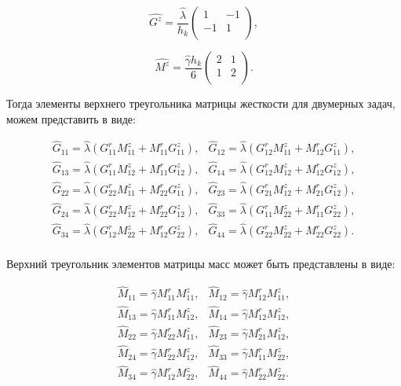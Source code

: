 \begin{equation*}
	\hat{G^z} = \frac{\hat{\lambda}}{h_k} \left(
	\begin{array}{rr}
		1 & -1\\
		-1 &  1\\
	\end{array}
	\right),
\end{equation*}

\begin{equation*}
	\hat{M^z} = \frac{\hat{\gamma} h_k}{6} \left(
	\begin{array}{rr}
		2 & 1\\
		1 & 2\\
	\end{array}
	\right).
\end{equation*}

Тогда элементы верхнего треугольника матрицы жесткости для двумерных задач, можем представить в виде:

\begin{equation*}
	\begin{array}{ll}
		\hat{G}_{11} = \hat{\lambda}\left(G^r_{11}M^z_{11} + M^r_{11}G^z_{11}\right), & \hat{G}_{12} = \hat{\lambda}\left(G^r_{12}M^z_{11} + M^r_{12}G^z_{11}\right),\\
		\hat{G}_{13} = \hat{\lambda}\left(G^r_{11}M^z_{12} + M^r_{11}G^z_{12}\right), & \hat{G}_{14} = \hat{\lambda}\left(G^r_{12}M^z_{12} + M^r_{12}G^z_{12}\right),\\
		\hat{G}_{22} = \hat{\lambda}\left(G^r_{22}M^z_{11} + M^r_{22}G^z_{11}\right), & \hat{G}_{23} = \hat{\lambda}\left(G^r_{21}M^z_{12} + M^r_{21}G^z_{12}\right),\\
		\hat{G}_{24} = \hat{\lambda}\left(G^r_{22}M^z_{12} + M^r_{22}G^z_{12}\right), & \hat{G}_{33} = \hat{\lambda}\left(G^r_{11}M^z_{22} + M^r_{11}G^z_{22}\right),\\
		\hat{G}_{34} = \hat{\lambda}\left(G^r_{12}M^z_{22} + M^r_{12}G^z_{22}\right), & \hat{G}_{44} = \hat{\lambda}\left(G^r_{22}M^z_{22} + M^r_{22}G^z_{22}\right).\\
	\end{array}
\end{equation*}

Верхний треугольник элементов матрицы масс может быть представлены в виде:

\begin{equation*}
	\begin{array}{ll}
		\hat{M}_{11} = \hat{\gamma}M^r_{11}M^z_{11}, & \hat{M}_{12} = \hat{\gamma}M^r_{12}M^z_{11},\\
		\hat{M}_{13} = \hat{\gamma}M^r_{11}M^z_{12}, & \hat{M}_{14} = \hat{\gamma}M^r_{12}M^z_{12},\\
		\hat{M}_{22} = \hat{\gamma}M^r_{22}M^z_{11}, & \hat{M}_{23} = \hat{\gamma}M^r_{21}M^z_{12},\\
		\hat{M}_{24} = \hat{\gamma}M^r_{22}M^z_{12}, & \hat{M}_{33} = \hat{\gamma}M^r_{11}M^z_{22},\\
		\hat{M}_{34} = \hat{\gamma}M^r_{12}M^z_{22}, & \hat{M}_{44} = \hat{\gamma}M^r_{22}M^z_{22}.\\
	\end{array}
\end{equation*}

